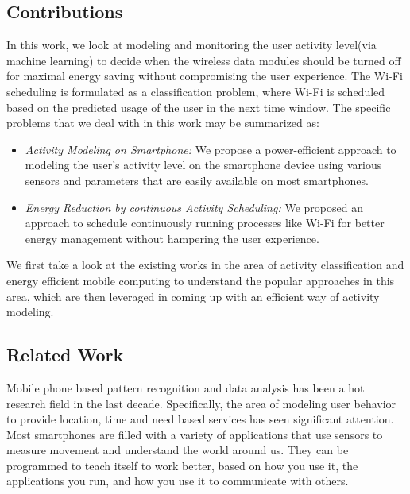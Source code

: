 \subsection{Contributions}
In this work, we look at modeling and monitoring the user activity level(via machine learning) to decide when the wireless data
modules should be turned off for maximal energy saving without compromising the user experience.
The Wi-Fi scheduling is formulated as a classification problem, where Wi-Fi is scheduled based on the predicted usage of the user in the next time window.
The specific problems that we deal with in this work may be summarized as:
\begin{itemize}
\item \emph{Activity Modeling on Smartphone:} We propose a power-efficient approach to modeling the
user's activity level on the smartphone device using various sensors and parameters that are easily available
on most smartphones.
\item \emph{Energy Reduction by continuous Activity Scheduling:} We proposed an approach to schedule
continuously running processes like Wi-Fi for better energy management without hampering the user experience.
\end{itemize}

We first take a look at the existing works in the area of activity classification and energy efficient mobile computing to understand
the popular approaches in this area, which are then leveraged in coming up with an efficient way of
activity modeling.

\subsection{Related Work}
Mobile phone based pattern recognition and data analysis has been a hot research field in the last decade.
Specifically, the area of modeling user behavior to provide location, time and need based services has seen
significant attention. Most smartphones are filled with a variety of applications that use sensors to measure
movement and understand the world around us. They can be programmed to teach itself to work better, based
on how you use it, the applications you run, and how you use it to communicate with others.

